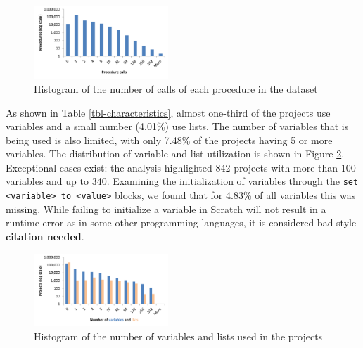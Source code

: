 \documentclass{sig-alternate}
\newcommand{\todo}[1]{\textbf{#1}}
\begin{document}
\begin{figure}
	\centering
	\includegraphics[width=0.45\textwidth]{fig/charts/7procedurecalls}
	\caption{Histogram of the number of calls of each procedure in the dataset}
	\label{fig:procedurecalls}
\end{figure}

As shown in Table \ref{tbl-characteristics}, almost one-third of the projects use variables and a small number (4.01\%) use lists. The number of variables that is being used is also limited, with only 7.48\% of the projects having 5 or more variables. The distribution of variable and list utilization is shown in Figure \ref{fig:variables}. Exceptional cases exist: the analysis highlighted 842 projects with more than 100 variables and up to 340. Examining the initialization of variables through the \texttt{set <variable> to <value>} blocks, we found that for 4.83\% of all variables this was missing. While failing to initialize a variable in Scratch will not result in a runtime error as in some other programming languages, it is considered bad style \todo{citation needed}.


\begin{figure}
	\centering
	\includegraphics[width=0.45\textwidth]{fig/charts/8variableslists}
	\caption{Histogram of the number of variables and lists used in the projects}
	\label{fig:variables}
\end{figure}
\end{document}
